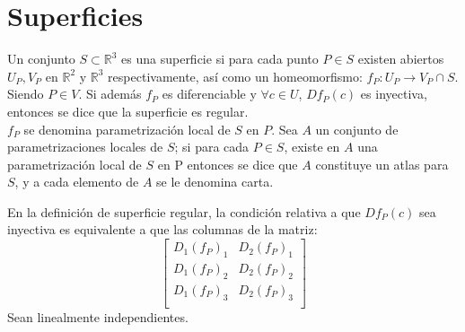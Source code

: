 \section{Superficies}
\begin{definition}
  Un conjunto $S \subset \mathbb{R}^3$ es una superficie si para cada punto $P
  \in S$ existen abiertos $U_P, V_P$ en $\mathbb{R}^2$ y $\mathbb{R}^3$
  respectivamente, así como un homeomorfismo: $f_P: U_P \to V_P \cap S$. Siendo
  $P \in V$. Si además $f_P$ es diferenciable y $\forall c \in U$, $Df_P(c)$ es
  inyectiva, entonces se dice que la superficie es regular. \\
  $f_P$ se denomina parametrización local de $S$ en $P$. Sea $A$ un conjunto de
  parametrizaciones locales de $S$; si para cada $P \in S$, existe en $A$ una
  parametrización local de $S$ en P entonces se dice que $A$ constituye un atlas
  para $S$, y a cada elemento de $A$ se le denomina carta.
\end{definition}
\begin{remark}
  En la definición de superficie regular, la condición relativa a que $D f_P(c)$
  sea inyectiva es equivalente a que las columnas de la matriz:
  \[
    \begin{bmatrix}
      D_1(f_P)_1 & D_2(f_P)_1 \\ 
      D_1(f_P)_2 & D_2(f_P)_2 \\ 
      D_1(f_P)_3 & D_2(f_P)_3 \\ 
    \end{bmatrix}
  \]
  Sean linealmente independientes.
\end{remark}

